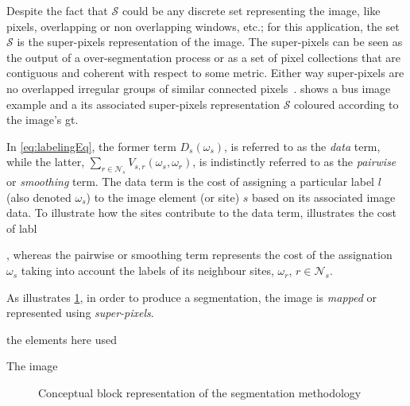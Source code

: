 Despite the fact that $\mathcal{S}$ could be any discrete set representing the image, like pixels, overlapping or non overlapping windows, etc.; 
for this application, the set $\mathcal{S}$ is the super-pixels representation of the image. 
The super-pixels can be seen as the output of a over-segmentation process or as a set of pixel collections that are contiguous and coherent with respect to some metric. Either way super-pixels are no overlapped irregular groups of similar connected pixels~\cite{achanta2012slic}.
 shows a \ac{bus} image example and a its associated super-pixels representation $\mathcal{S}$ coloured according to the image's \ac{gt}.

In \cref{eq:labelingEq}, the former term $D_s(\omega_s)$, is referred to as the \emph{data} term, while the latter, $\sum_{r \in \mathcal{N}_{s}} V_{s,r}(\omega_s,\omega_r)$, is indistinctly referred to as the \emph{pairwise} or \emph{smoothing} term.
 The data term is the cost of assigning a particular label $l$ (also denoted $\omega_s$) to the image element (or site) $s$ based on its associated image data.
To illustrate how the sites contribute to the data term, 
 illustrates the cost of labl 

 
 , whereas the pairwise or smoothing term represents the cost of the assignation $\omega_s$ taking into account the labels of its neighbour sites, $\omega_r$, $r \in \mathcal{N}_{s}$. 

As illustrates \cref{fig:method}, in order to produce a segmentation, the image is \emph{mapped} or represented using \emph{super-pixels}. 

the elements here used 

 The image 
%
%
%
%
\begin{figure}[htpb]
  \centering
  \caption{Conceptual block representation of the segmentation methodology}
  \label{fig:method}
\end{figure}

